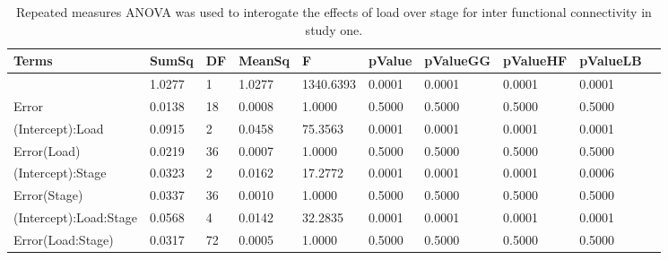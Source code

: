 \begin{table}
\centering
\begin{tabular}[0.2em]{@{}llllllllll@{}}\toprule
Terms & SumSq & DF & MeanSq & F & pValue & pValueGG & pValueHF & pValueLB\\\toprule[0.2em]
(Intercept) & 1.0277 & 1 & 1.0277 & 1340.6393 & 0.0001 & 0.0001 & 0.0001 & 0.0001 \\\midrule
Error & 0.0138 & 18 & 0.0008 & 1.0000 & 0.5000 & 0.5000 & 0.5000 & 0.5000 \\\midrule
(Intercept):Load & 0.0915 & 2 & 0.0458 & 75.3563 & 0.0001 & 0.0001 & 0.0001 & 0.0001 \\\midrule
Error(Load) & 0.0219 & 36 & 0.0007 & 1.0000 & 0.5000 & 0.5000 & 0.5000 & 0.5000 \\\midrule
(Intercept):Stage & 0.0323 & 2 & 0.0162 & 17.2772 & 0.0001 & 0.0001 & 0.0001 & 0.0006 \\\midrule
Error(Stage) & 0.0337 & 36 & 0.0010 & 1.0000 & 0.5000 & 0.5000 & 0.5000 & 0.5000 \\\midrule
(Intercept):Load:Stage & 0.0568 & 4 & 0.0142 & 32.2835 & 0.0001 & 0.0001 & 0.0001 & 0.0001 \\\midrule
Error(Load:Stage) & 0.0317 & 72 & 0.0005 & 1.0000 & 0.5000 & 0.5000 & 0.5000 & 0.5000 \\\bottomrule[0.2em]
\end{tabular}
\caption{Repeated measures ANOVA was used to interogate the effects of load over stage for inter functional connectivity in study one.\label{tabel:tbl_RMAEFC1}}
\end{table}
